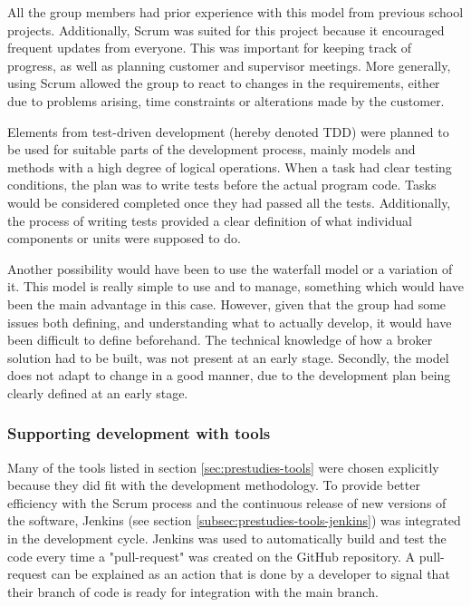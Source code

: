 All the group members had prior experience with this model from previous school projects. Additionally, Scrum was suited for this project because it encouraged frequent updates from everyone. This was important for keeping track of progress, as well as planning customer and supervisor meetings. More generally, using Scrum allowed the group to react to changes in the requirements, either due to problems arising, time constraints or alterations made by the customer. 

Elements from test-driven development (hereby denoted TDD) were planned to be used for suitable parts of the development process, mainly models and methods with a high degree of logical operations. When a task had clear testing conditions, the plan was to write tests before the actual program code. Tasks would be considered completed once they had passed all the tests. Additionally, the process of writing tests provided a clear definition of what individual components or units were supposed to do.

Another possibility would have been to use the waterfall model or a variation of it. This model is really simple to use and to manage, something which would have been the main advantage in this case. However, given that the group had some issues both defining, and understanding what to actually develop, it would have been difficult to define beforehand. The technical knowledge of how a broker solution had to be built, was not present at an early stage. Secondly, the model does not adapt to change in a good manner, due to the development plan being clearly defined at an early stage. 

\subsubsection{Supporting development with tools}
Many of the tools listed in section \ref{sec:prestudies-tools} were chosen explicitly because they did fit with the development methodology. To provide better efficiency with the Scrum process and the continuous release of new versions of the software, Jenkins (see section \ref{subsec:prestudies-tools-jenkins}) was integrated in the development cycle. Jenkins was used to automatically build and test the code every time a "pull-request" was created on the GitHub repository. A pull-request can be explained as an action that is done by a developer to signal that their branch of code is ready for integration with the main branch. 

